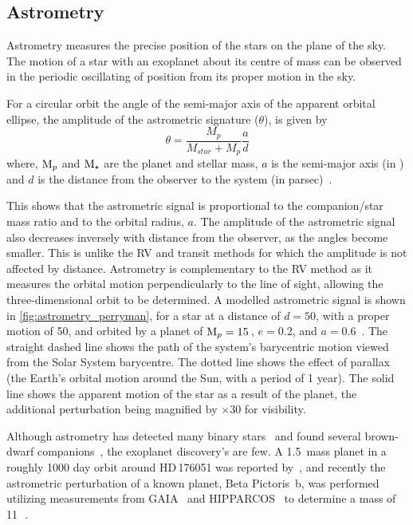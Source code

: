\subsection{Astrometry}

\label{subsec:astrometry}
Astrometry measures the precise position of the stars on the plane of the sky.
The motion of a star with an exoplanet about its centre of mass can be observed in the periodic oscillating of position from its proper motion in the sky.

For a circular orbit the angle of the semi-major axis of the apparent orbital ellipse, the amplitude of the astrometric signature ($\theta$), is given by
\begin{equation}
\theta = \frac{M_{p}}{M_{star} + M_{p}} \frac{a}{d}
\end{equation}
where, \(\textrm{M}_{p}\) and $\textrm{M}_{\star}$ are the planet and stellar mass, \(a\) is the semi-major axis (in \AU) and \(d\) is the distance from the observer to the system (in parsec)~\citep{perryman_exoplanet_2011}.

This shows that the astrometric signal is proportional to the companion/star mass ratio and to the orbital radius, \(a\).
The amplitude of the astrometric signal also decreases inversely with distance from the observer, as the angles become smaller.
This is unlike the {RV} and transit methods for which the amplitude is not affected by distance.
Astrometry is complementary to the {RV} method as it measures the orbital motion perpendicularly to the line of sight, allowing the three-dimensional orbit to be determined.
A modelled astrometric signal is shown in \cref{fig:astrometry_perryman}, for a star at a distance of $d=50$\pc, with a proper motion of 50\masperyr{}, and orbited by a planet of $\textrm{M}_{p}=15$\,\Mjup{}, $e=0.2$, and $a=0.6$\AU~\citep{perryman_extrasolar_2000}.
The straight dashed line shows the path of the system's barycentric motion viewed from the Solar System barycentre.
The dotted line shows the effect of parallax (the Earth's orbital motion around the Sun, with a period of 1 year).
The solid line shows the apparent motion of the star as a result of the planet, the additional perturbation being magnified by $\times 30$ for visibility.

Although astrometry has detected many binary stars~\citep[e.g.][]{gontcharov_new_2000} and found several brown-dwarf companions~\citep[e.g.][]{sahlmann_search_2011}, the exoplanet discovery's are few.
A 1.5\,\Mjup{} mass planet in a roughly 1000 day orbit around {HD\,176051} was reported by~\citet{muterspaugh_phases_2010}, and recently the astrometric perturbation of a known planet, {Beta Pictoris~b}, was performed utilizing measurements from {GAIA}~\citep{collaboration_gaia_2016a} and {HIPPARCOS}~\citep{esa_hipparcos_1997} to determine a mass of 11\,\Mjup~\citep{snellen_mass_2018}.

